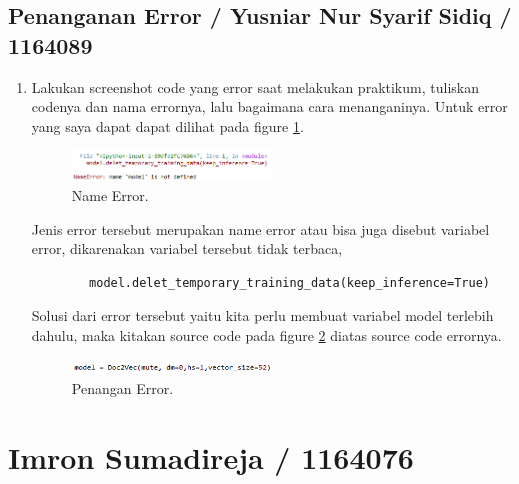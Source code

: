 \subsection{Penanganan Error / Yusniar Nur Syarif Sidiq / 1164089}
\begin{enumerate}

\item Lakukan screenshot code yang error saat melakukan praktikum, tuliskan codenya dan nama errornya, lalu bagaimana cara menanganinya.
	\subitem Untuk error yang saya dapat dapat dilihat pada figure \ref{YNC5-34}.
	
	\begin{figure}[!htbp]
		\centerline{\includegraphics[width=0.5\textwidth]{figures/YN/Chapter5/Praktek/YNC5-34.PNG}}
		\caption{Name Error.}
		\label{YNC5-34}
	\end{figure}	
	
	\subitem Jenis error tersebut merupakan name error atau bisa juga disebut variabel error, dikarenakan variabel tersebut tidak terbaca,
		
	\begin{verbatim}
		model.delet_temporary_training_data(keep_inference=True)
	\end{verbatim}

	\subitem Solusi dari error tersebut yaitu kita perlu membuat variabel model terlebih dahulu, maka kitakan source code pada figure \ref{YNC5-35} diatas source code errornya.

	\begin{figure}[!htbp]
		\centerline{\includegraphics[width=0.5\textwidth]{figures/YN/Chapter5/Praktek/YNC5-35.PNG}}
		\caption{Penangan Error.}
		\label{YNC5-35}
	\end{figure}	

\end{enumerate}

\section{Imron Sumadireja / 1164076}
